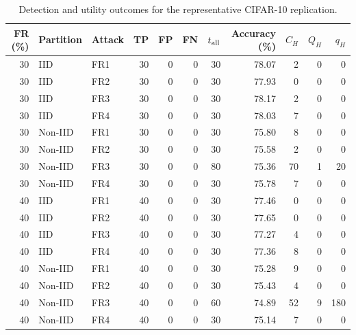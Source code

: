 \begin{table}[t]
\centering\footnotesize\setlength{\tabcolsep}{4pt}
\caption{Detection and utility outcomes for the representative CIFAR-10 replication.}\label{tab:detail-cifar10}
\begin{tabular}{rllrrrrrrrr}
\toprule
FR (\%) & Partition & Attack & TP & FP & FN & $t_{\rm all}$ & Accuracy (\%) & $C_H$ & $Q_H$ & $q_H$ \\
\midrule
30 & IID & FR1 & 30 & 0 & 0 & 30 & 78.07 & 2 & 0 & 0 \\
30 & IID & FR2 & 30 & 0 & 0 & 30 & 77.93 & 0 & 0 & 0 \\
30 & IID & FR3 & 30 & 0 & 0 & 30 & 78.17 & 2 & 0 & 0 \\
30 & IID & FR4 & 30 & 0 & 0 & 30 & 78.03 & 7 & 0 & 0 \\
30 & Non-IID & FR1 & 30 & 0 & 0 & 30 & 75.80 & 8 & 0 & 0 \\
30 & Non-IID & FR2 & 30 & 0 & 0 & 30 & 75.58 & 2 & 0 & 0 \\
30 & Non-IID & FR3 & 30 & 0 & 0 & 80 & 75.36 & 70 & 1 & 20 \\
30 & Non-IID & FR4 & 30 & 0 & 0 & 30 & 75.78 & 7 & 0 & 0 \\
40 & IID & FR1 & 40 & 0 & 0 & 30 & 77.46 & 0 & 0 & 0 \\
40 & IID & FR2 & 40 & 0 & 0 & 30 & 77.65 & 0 & 0 & 0 \\
40 & IID & FR3 & 40 & 0 & 0 & 30 & 77.27 & 4 & 0 & 0 \\
40 & IID & FR4 & 40 & 0 & 0 & 30 & 77.36 & 8 & 0 & 0 \\
40 & Non-IID & FR1 & 40 & 0 & 0 & 30 & 75.28 & 9 & 0 & 0 \\
40 & Non-IID & FR2 & 40 & 0 & 0 & 30 & 75.43 & 4 & 0 & 0 \\
40 & Non-IID & FR3 & 40 & 0 & 0 & 60 & 74.89 & 52 & 9 & 180 \\
40 & Non-IID & FR4 & 40 & 0 & 0 & 30 & 75.14 & 7 & 0 & 0 \\
\bottomrule
\end{tabular}

\end{table}
